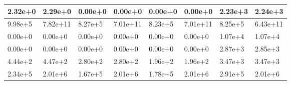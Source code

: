 \documentclass{article}
\begin{document}
 \begin{tabular}{ |l | l | l | l | l | l | l | l | }
\hline
2.32e+0 & 2.29e+0 & 0.00e+0 & 0.00e+0 & 0.00e+0 & 0.00e+0 & 2.23e+3 & 2.24e+3 \\ \hline 
9.98e+5 & 7.82e+11 & 8.27e+5 & 7.01e+11 & 8.23e+5 & 7.01e+11 & 8.25e+5 & 6.43e+11 \\ \hline 
0.00e+0 & 0.00e+0 & 0.00e+0 & 0.00e+0 & 0.00e+0 & 0.00e+0 & 1.07e+4 & 1.07e+4 \\ \hline 
0.00e+0 & 0.00e+0 & 0.00e+0 & 0.00e+0 & 0.00e+0 & 0.00e+0 & 2.87e+3 & 2.85e+3 \\ \hline 
4.44e+2 & 4.47e+2 & 2.80e+2 & 2.80e+2 & 1.96e+2 & 1.96e+2 & 3.47e+3 & 3.47e+3 \\ \hline 
2.34e+5 & 2.01e+6 & 1.67e+5 & 2.01e+6 & 1.78e+5 & 2.01e+6 & 2.91e+5 & 2.01e+6 \\ \hline 
\hline
\end{tabular}
\end{document}
